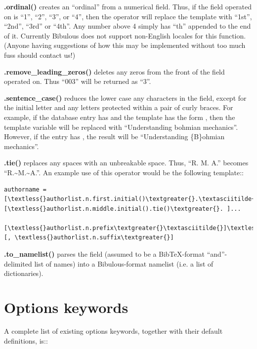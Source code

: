 \documentclass[letterpaper,10pt,english]{sphinxmanual}
\begin{document}
\textbf{.ordinal()} creates an ``ordinal'' from a numerical field. Thus, if the field operated on is ``1'', ``2'', ``3'', or ``4'', then the operator will replace the template with ``1st'', ``2nd'', ``3rd'' or ``4th''. Any number above 4 simply has ``th'' appended to the end of it. Currently Bibulous does not support non-English locales for this function. (Anyone having suggestions of how this may be implemented without too much fuss should contact us!)

\textbf{.remove\_leading\_zeros()} deletes any zeros from the front of the field operated on. Thus ``003'' will be returned as ``3''.

\textbf{.sentence\_case()} reduces the lower case any characters in the field, except for the initial letter and any letters protected within a pair of curly braces. For example, if the database entry has  and the template has the form , then the template variable will be replaced with ``Understanding bohmian mechanics''. However, if the entry has , the result will be ``Understanding \{B\}ohmian mechanics''.

\textbf{.tie()} replaces any spaces with an unbreakable space. Thus, ``R. M. A.'' becomes ``R.\textasciitilde{}M.\textasciitilde{}A.''. An example use of this operator would be the following template::

\begin{Verbatim}[commandchars=\\\{\}]
authorname = [\textless{}authorlist.n.first.initial()\textgreater{}.\textasciitilde{}][\textless{}authorlist.n.middle.initial().tie()\textgreater{}. ]...
             [\textless{}authorlist.n.prefix\textgreater{}\textasciitilde{}]\textless{}authorlist.n.last\textgreater{}[, \textless{}authorlist.n.suffix\textgreater{}]
\end{Verbatim}

\textbf{.to\_namelist()} parses the field (assumed to be a BibTeX-format ``and''-delimited list of names) into a Bibulous-format namelist (i.e. a list of dictionaries).


\section{Options keywords}
\label{guidelines_for_writing_style_templates:options-keywords}
A complete list of existing options keywords, together with their default definitions, is::
\end{document}
